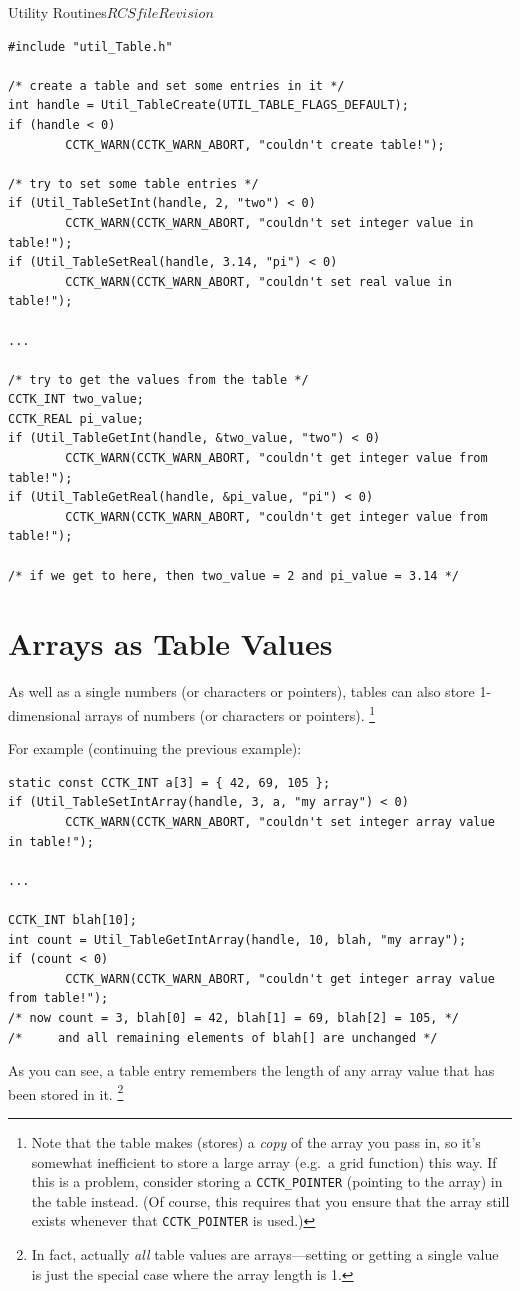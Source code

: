 \begin{cactuspart}{Utility Routines}{$RCSfile$}{$Revision$}
\begin{verbatim}
#include "util_Table.h"

/* create a table and set some entries in it */
int handle = Util_TableCreate(UTIL_TABLE_FLAGS_DEFAULT);
if (handle < 0)
        CCTK_WARN(CCTK_WARN_ABORT, "couldn't create table!");

/* try to set some table entries */
if (Util_TableSetInt(handle, 2, "two") < 0)
        CCTK_WARN(CCTK_WARN_ABORT, "couldn't set integer value in table!");
if (Util_TableSetReal(handle, 3.14, "pi") < 0)
        CCTK_WARN(CCTK_WARN_ABORT, "couldn't set real value in table!");

...

/* try to get the values from the table */
CCTK_INT two_value;
CCTK_REAL pi_value;
if (Util_TableGetInt(handle, &two_value, "two") < 0)
        CCTK_WARN(CCTK_WARN_ABORT, "couldn't get integer value from table!");
if (Util_TableGetReal(handle, &pi_value, "pi") < 0)
        CCTK_WARN(CCTK_WARN_ABORT, "couldn't get integer value from table!");

/* if we get to here, then two_value = 2 and pi_value = 3.14 */
\end{verbatim}


\section{Arrays as Table Values}

As well as a single numbers (or characters or pointers), tables can
also store 1-dimensional arrays of numbers (or characters or pointers).%
\footnote{%
	 Note that the table makes (stores) a \emph{copy} of the array
	 you pass in, so it's somewhat inefficient to store a large array
	 (e.g.~a grid function) this way.  If this is a problem, consider
	 storing a \texttt{CCTK\_POINTER} (pointing to the array) in the table
	 instead.  (Of course, this requires that you ensure that the array still exists whenever that \texttt{CCTK\_POINTER} is used.)
	 }%

For example (continuing the previous example):
\begin{verbatim}
static const CCTK_INT a[3] = { 42, 69, 105 };
if (Util_TableSetIntArray(handle, 3, a, "my array") < 0)
        CCTK_WARN(CCTK_WARN_ABORT, "couldn't set integer array value in table!");

...

CCTK_INT blah[10];
int count = Util_TableGetIntArray(handle, 10, blah, "my array");
if (count < 0)
        CCTK_WARN(CCTK_WARN_ABORT, "couldn't get integer array value from table!");
/* now count = 3, blah[0] = 42, blah[1] = 69, blah[2] = 105, */
/*     and all remaining elements of blah[] are unchanged */
\end{verbatim}
As you can see, a table entry remembers the length of any array
value that has been stored in it.%
\footnote{%
	 In fact, actually \emph{all} table values are
	 arrays---setting or getting a single value is
	 just the special case where the array length is 1.
	 }%
{}


\end{cactuspart}
